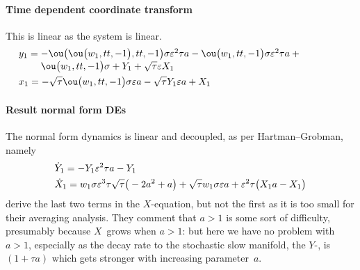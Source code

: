 \paragraph{Time dependent coordinate transform}  This is linear as the system is linear.
\begin{align*}&
y_{1}=\ParMath{-\ou\big(\ou\big(w_{1},tt,-1\big),tt,-1\big) \sigma  \eps^{2} 
\tau  a-\ou\big(w_{1},tt,-1\big) \sigma  \eps^{2} \tau  a+\ou\big(w_{1},
tt,-1\big) \sigma +Y_{1}+\sqrt {\tau } \eps X_{1}
}
\\&
x_{1}=-\sqrt {\tau } \ou\big(w_{1},tt,-1\big) \sigma  \eps a-\sqrt {
\tau } Y_{1} \eps a+X_{1}
\end{align*}

\paragraph{Result normal form DEs}
The normal form dynamics is linear and decoupled, as per Hartman--Grobman, namely
\begin{align*}&
\dot Y_{1}=-Y_{1} \varepsilon^{2} \tau  a-Y_{1}
\\&
\dot X_{1}=w_{1} \sigma  \varepsilon^{3} \tau\sqrt {\tau }  \big(-2 a^{2}+
 a\big)+\sqrt {\tau } w_{1} \sigma  \varepsilon a+\varepsilon^{2} \tau  
\big(X_{1} a-X_{1}\big)
\end{align*}
\cite{Monahan2011} derive the last two terms in the $X$-equation, but not the first as it is too small for their averaging analysis.
They comment that $a>1$ is some sort of difficulty, presumably because \(X\)~grows when \(a>1\): but here we have no problem with $a>1$, especially as the decay rate to the stochastic slow manifold, the $Y$-\sde, is $(1+\tau a)$ which gets stronger with increasing parameter~$a$.




